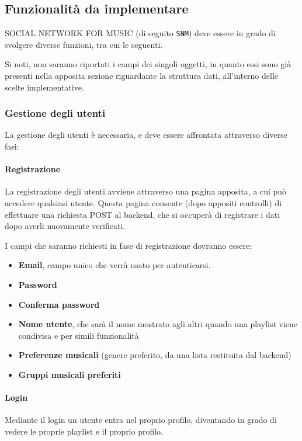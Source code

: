 \subsection{Funzionalità da implementare}
\uppercase{Social Network for Music} (di seguito \verb|SNM|) deve essere in grado di svolgere diverse funzioni, tra cui le seguenti.

Si noti, non saranno riportati i campi dei singoli oggetti, in quanto essi sono già presenti nella apposita sezione riguardante la struttura dati, all'interno delle scelte implementative.
\subsubsection{Gestione degli utenti}
La gestione degli utenti è necessaria, e deve essere affrontata attraverso diverse fasi:
\paragraph{Registrazione} La registrazione degli utenti avviene attraverso una pagina apposita, a cui può accedere qualsiasi utente. Questa pagina consente (dopo appositi controlli) di effettuare una richiesta POST al backend, che si occuperà di registrare i dati dopo averli nuovamente verificati.

I campi che saranno richiesti in fase di registrazione dovranno essere:
\begin{itemize}
    \item \textbf{Email}, campo unico che verrà usato per autenticarsi.
    \item \textbf{Password}
    \item \textbf{Conferma password}
    \item \textbf{Nome utente}, che sarà il nome mostrato agli altri quando una playlist viene condivisa e per simili funzionalità
    \item \textbf{Preferenze musicali} (genere preferito, da una lista restituita dal backend)
    \item \textbf{Gruppi musicali preferiti}
\end{itemize}
\paragraph{Login} Mediante il login un utente entra nel proprio profilo, diventando in grado di vedere le proprie playlist e il proprio profilo.

